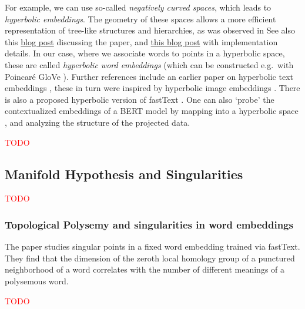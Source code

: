 \documentclass[11pt, a4paper]{amsart}
\begin{document}
For example, we can use so-called \emph{negatively curved spaces}, which leads to \emph{hyperbolic embeddings}.
The geometry of these spaces allows a more efficient representation of tree-like structures and hierarchies, as was observed in \cite{DBLP:journals/corr/NickelK17}
See also this \href{https://bjlkeng.github.io/posts/hyperbolic-geometry-and-poincare-embeddings/}{blog post} discussing the paper, and \href{https://rare-technologies.com/implementing-poincare-embeddings/}{this blog post} with implementation details.
In our case, where we associate words to points in a hyperbolic space, these are called \emph{hyperbolic word embeddings} (which can be constructed e.g.\ with Poincar{\'e} GloVe \cite{DBLP:journals/corr/abs-1810-06546}).
Further references include an earlier paper on hyperbolic text embeddings \cite{DBLP:journals/corr/abs-1806-04313},
these in turn were inspired by hyperbolic image embeddings \cite{DBLP:journals/corr/abs-1904-02239}.
There is also a proposed hyperbolic version of fastText \cite{zhu-etal-2020-hypertext}.
One can also `probe' the contextualized embeddings of a BERT model by mapping into a hyperbolic space \cite{DBLP:journals/corr/abs-2104-03869}, and analyzing the structure of the projected data.

\textcolor{red}{TODO}


\subsection{Manifold Hypothesis and Singularities}

\textcolor{red}{TODO}

\subsubsection{Topological Polysemy and singularities in word embeddings}

The paper \cite{jakubowski2020topology} studies singular points in a fixed word embedding trained via fastText.
They find that the dimension of the zeroth local homology group of a punctured neighborhood of a word correlates with the number of different meanings of a polysemous word.

\textcolor{red}{TODO}
\end{document}
